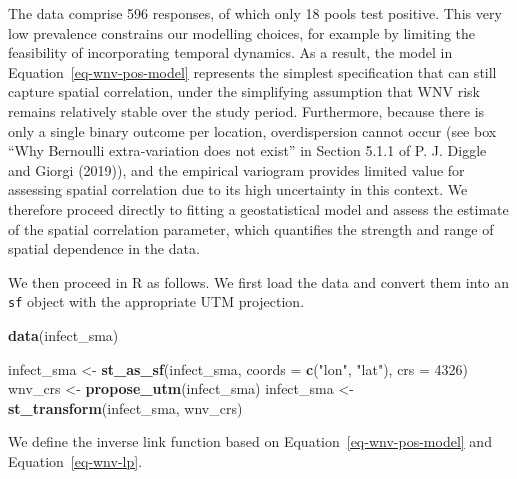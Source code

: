 \documentclass[
  letterpaper,
]{krantz}
\newenvironment{Shaded}{\begin{snugshade}}{\end{snugshade}}
\newcommand{\AttributeTok}[1]{\textcolor[rgb]{0.13,0.29,0.53}{#1}}
\newcommand{\ControlFlowTok}[1]{\textcolor[rgb]{0.13,0.29,0.53}{\textbf{#1}}}
\newcommand{\DecValTok}[1]{\textcolor[rgb]{0.00,0.00,0.81}{#1}}
\newcommand{\FunctionTok}[1]{\textcolor[rgb]{0.13,0.29,0.53}{\textbf{#1}}}
\newcommand{\NormalTok}[1]{#1}
\newcommand{\OtherTok}[1]{\textcolor[rgb]{0.56,0.35,0.01}{#1}}
\newcommand{\SpecialCharTok}[1]{\textcolor[rgb]{0.81,0.36,0.00}{\textbf{#1}}}
\newcommand{\StringTok}[1]{\textcolor[rgb]{0.31,0.60,0.02}{#1}}
\begin{document}
The data comprise 596 responses, of which only 18 pools test positive.
This very low prevalence constrains our modelling choices, for example
by limiting the feasibility of incorporating temporal dynamics. As a
result, the model in Equation~\ref{eq-wnv-pos-model} represents the
simplest specification that can still capture spatial correlation, under
the simplifying assumption that WNV risk remains relatively stable over
the study period. Furthermore, because there is only a single binary
outcome per location, overdispersion cannot occur (see box ``Why
Bernoulli extra‐variation does not exist'' in Section 5.1.1 of P. J.
Diggle and Giorgi (2019)), and the empirical variogram provides limited
value for assessing spatial correlation due to its high uncertainty in
this context. We therefore proceed directly to fitting a geostatistical
model and assess the estimate of the spatial correlation parameter,
which quantifies the strength and range of spatial dependence in the
data.

We then proceed in R as follows. We first load the data and convert them
into an \texttt{sf} object with the appropriate UTM projection.

\begin{Shaded}
\begin{Highlighting}[]
\FunctionTok{data}\NormalTok{(infect\_sma)}

\NormalTok{infect\_sma }\OtherTok{\textless{}{-}} \FunctionTok{st\_as\_sf}\NormalTok{(infect\_sma, }\AttributeTok{coords =} \FunctionTok{c}\NormalTok{(}\StringTok{"lon"}\NormalTok{, }\StringTok{"lat"}\NormalTok{), }\AttributeTok{crs =} \DecValTok{4326}\NormalTok{)}
\NormalTok{wnv\_crs }\OtherTok{\textless{}{-}} \FunctionTok{propose\_utm}\NormalTok{(infect\_sma)}
\NormalTok{infect\_sma }\OtherTok{\textless{}{-}} \FunctionTok{st\_transform}\NormalTok{(infect\_sma, wnv\_crs)}
\end{Highlighting}
\end{Shaded}

We define the inverse link function based on
Equation~\ref{eq-wnv-pos-model} and Equation~\ref{eq-wnv-lp}.

\begin{Shaded}
\end{Shaded}
\end{document}
